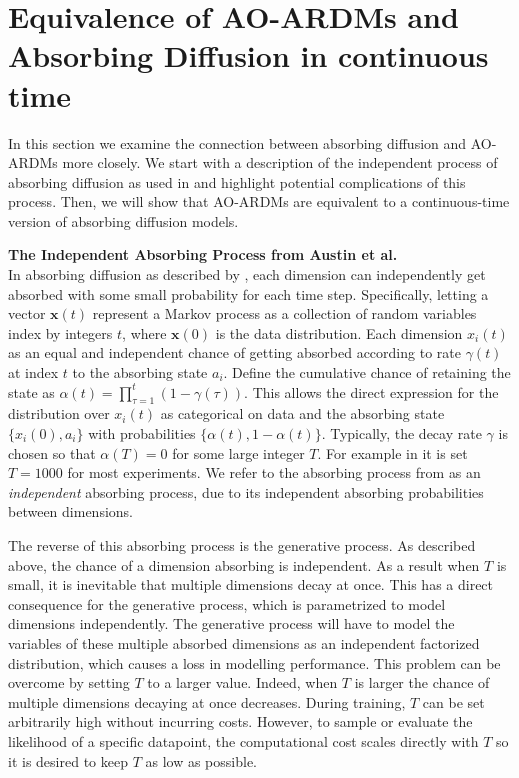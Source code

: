 \documentclass{article} \usepackage{iclr2022_conference,times}
\def\vx{{\bm{x}}}
\begin{document}
\section{Equivalence of AO-ARDMs and Absorbing Diffusion in continuous time}
\label{sec:diffusion_connection}
In this section we examine the connection between absorbing diffusion and AO-ARDMs more closely. We start with a description of the independent process of absorbing diffusion as used in \citep{austin2021structured} and highlight potential complications of this process. Then, we will show that AO-ARDMs are equivalent to a continuous-time version of absorbing diffusion models.


\textbf{The Independent Absorbing Process from Austin et al.} \\
In absorbing diffusion as described by \citep{austin2021structured}, each dimension can independently get absorbed with some small probability for each time step. Specifically, letting a vector $\vx(t)$ represent a Markov process as a collection of random variables index by integers $t$, where $\vx(0)$ is the data distribution. Each dimension $x_i(t)$ as an equal and independent chance of getting absorbed according to rate $\gamma(t)$ at index $t$ to the absorbing state $a_i$. Define the cumulative chance of retaining the state as $\alpha(t) = \prod_{\tau = 1}^t (1 - \gamma(\tau))$. This allows the direct expression for the distribution over $x_i(t)$ as categorical on data and the absorbing state $\{x_{i}(0), a_i\}$ with probabilities $\{\alpha(t), 1 - \alpha(t)\}$. Typically, the decay rate $\gamma$ is chosen so that $\alpha(T) = 0$ for some large integer $T$. For example in \citep{austin2021structured} it is set $T = 1000$ for most experiments. We refer to the absorbing process from \citep{austin2021structured} as an \textit{independent} absorbing process, due to its independent absorbing probabilities between dimensions.


The reverse of this absorbing process is the generative process. As described above, the chance of a dimension absorbing is independent. As a result when $T$ is small, it is inevitable that multiple dimensions decay at once. This has a direct consequence for the generative process, which is parametrized to model dimensions independently. The generative process will have to model the variables of these multiple absorbed dimensions as an independent factorized distribution, which causes a loss in modelling performance. This problem can be overcome by setting $T$ to a larger value. Indeed, when $T$ is larger the chance of multiple dimensions decaying at once decreases. During training, $T$ can be set arbitrarily high without incurring costs. However, to sample or evaluate the likelihood of a specific datapoint, the computational cost scales directly with $T$ so it is desired to keep $T$ as low as possible. 
\end{document}
